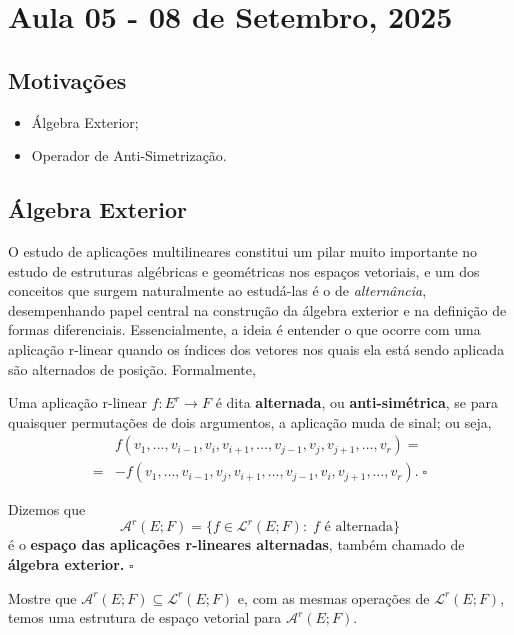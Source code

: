 \documentclass[../differential_forms.tex]{subfiles}
\begin{document}
\section{Aula 05 - 08 de Setembro, 2025}
\subsection{Motivações}
\begin{itemize}
	\item Álgebra Exterior;
	\item Operador de Anti-Simetrização.
\end{itemize}
\subsection{Álgebra Exterior}
O estudo de aplicações multilineares constitui um pilar muito importante no estudo de estruturas algébricas e geométricas nos espaços vetoriais,
e um dos conceitos que surgem naturalmente ao estudá-las é o de \textit{alternância}, desempenhando papel central na construção da álgebra
exterior e na definição de formas diferenciais. Essencialmente, a ideia é entender o que ocorre com uma aplicação r-linear quando os índices
dos vetores nos quais ela está sendo aplicada são alternados de posição. Formalmente,
\begin{def*}
	Uma aplicação r-linear \(f:E^{r}\rightarrow F\) é dita \textbf{alternada}, ou \textbf{anti-simétrica}, se para quaisquer permutações de dois argumentos, a aplicação muda de sinal; ou seja,
	\begin{align*}
		  & f(v_1, \dotsc , v_{i-1}, v_{i}, v_{i+1}, \dotsc , v_{j-1}, v_{j}, v_{j+1}, \dotsc , v_r) =          \\
		= & -f(v_1,\dotsc , v_{i-1}, v_{j}, v_{i+1}, \dotsc , v_{j-1}, v_{i}, v_{j+1}, \dotsc , v_r).\; \square
	\end{align*}
\end{def*}
\begin{def*}
	Dizemos que
	\[
		\mathcal{A}^{r}(E; F)=\{f\in \mathcal{L}^{r}(E; F):\; f \text{ é alternada}\}
	\]
	é o \textbf{espaço das aplicações r-lineares alternadas}, também chamado de \textbf{álgebra exterior.} \(\square\)
\end{def*}
\begin{exr}
	Mostre que \(\mathcal{A}^{r}(E; F) \subseteq \mathcal{L}^{r}(E; F)\) e, com as mesmas operações de \(\mathcal{L}^{r}(E; F)\), temos uma estrutura de espaço vetorial para \(\mathcal{A}^{r}(E; F).\)
\end{exr}
\end{document}
